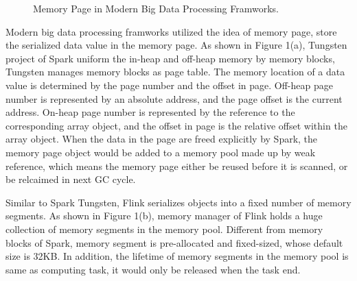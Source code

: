 \documentclass[sigplan, screen]{acmart}
\begin{document}
\begin{figure}
  \centering
  \caption{Memory Page in Modern Big Data Processing Framworks.}
\end{figure}

Modern big data processing framworks utilized the idea of memory page, store the serialized data value in the memory page. As shown in Figure 1(a), Tungsten project of Spark uniform the in-heap and off-heap memory by memory blocks,
Tungsten manages memory blocks as page table. The memory location of a data value is determined by the page number and the offset in page. Off-heap page number is represented by an 
absolute address, and the page offset is the current address. On-heap page number is represented by the reference to the corresponding array object, and the offset in page 
is the relative offset within the array object. When the data in the page are freed explicitly by Spark, the memory page object would be added to a memory pool made up by weak reference, 
which means the memory page either be reused before it is scanned, or be relcaimed in next GC cycle. 

Similar to Spark Tungsten, Flink serializes objects into a fixed number of memory segments. As shown in Figure 1(b), memory manager of Flink holds a huge collection of 
memory segments in the memory pool. Different from memory blocks of Spark, memory segment is pre-allocated and fixed-sized, whose default size is 32KB. In addition, the lifetime of memory segments in the memory pool is 
same as computing task, it would only be released when the task end.
\end{document}
